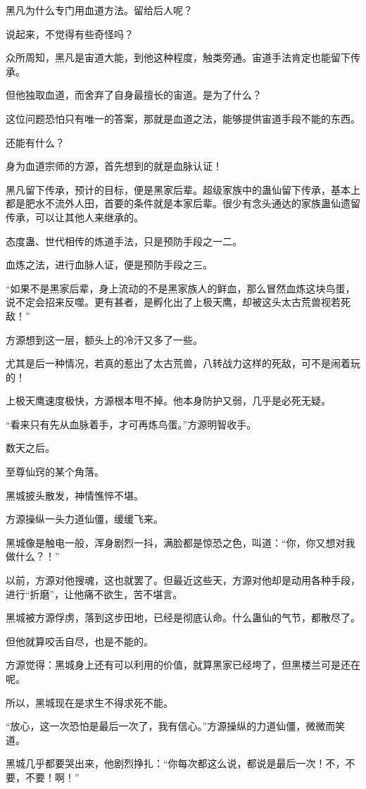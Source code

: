 \begin{this_body}
黑凡为什么专门用血道方法。留给后人呢？

说起来，不觉得有些奇怪吗？

众所周知，黑凡是宙道大能，到他这种程度，触类旁通。宙道手法肯定也能留下传承。

但他独取血道，而舍弃了自身最擅长的宙道。是为了什么？

这位问题恐怕只有唯一的答案，那就是血道之法，能够提供宙道手段不能的东西。

还能有什么？

身为血道宗师的方源，首先想到的就是血脉认证！

黑凡留下传承，预计的目标，便是黑家后辈。超级家族中的蛊仙留下传承，基本上都是肥水不流外人田，首要的条件就是本家后辈。很少有念头通达的家族蛊仙遗留传承，可以让其他人来继承的。

态度蛊、世代相传的炼道手法，只是预防手段之一二。

血炼之法，进行血脉人证，便是预防手段之三。

“如果不是黑家后辈，身上流动的不是黑家族人的鲜血，那么冒然血炼这块鸟蛋，说不定会招来反噬。更有甚者，是孵化出了上极天鹰，却被这头太古荒兽视若死敌！”

方源想到这一层，额头上的冷汗又多了一些。

尤其是后一种情况，若真的惹出了太古荒兽，八转战力这样的死敌，可不是闹着玩的！

上极天鹰速度极快，方源根本甩不掉。他本身防护又弱，几乎是必死无疑。

“看来只有先从血脉着手，才可再炼鸟蛋。”方源明智收手。

数天之后。

至尊仙窍的某个角落。

黑城披头散发，神情憔悴不堪。

方源操纵一头力道仙僵，缓缓飞来。

黑城像是触电一般，浑身剧烈一抖，满脸都是惊恐之色，叫道：“你，你又想对我做什么？！”

以前，方源对他搜魂，这也就罢了。但最近这些天，方源对他却是动用各种手段，进行“折磨”，让他痛不欲生，苦不堪言。

黑城被方源俘虏，落到这步田地，已经是彻底认命。什么蛊仙的气节，都散尽了。

但他就算咬舌自尽，也是不能的。

方源觉得：黑城身上还有可以利用的价值，就算黑家已经垮了，但黑楼兰可是还在呢。

所以，黑城现在是求生不得求死不能。

“放心，这一次恐怕是最后一次了，我有信心。”方源操纵的力道仙僵，微微而笑道。

黑城几乎都要哭出来，他剧烈挣扎：“你每次都这么说，都说是最后一次！不，不要，不要！啊！”

\end{this_body}

